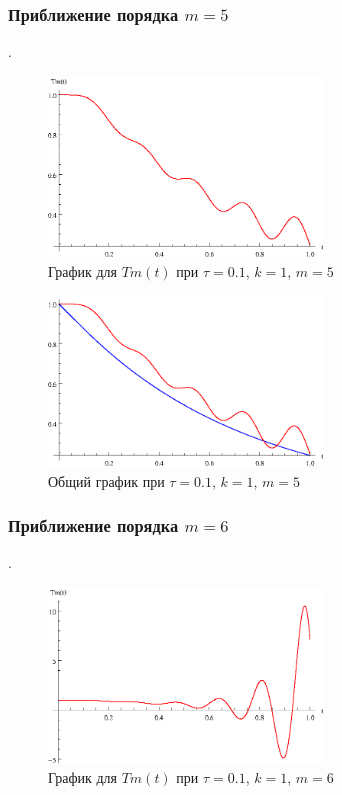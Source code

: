 \newpage

\subsubsection{Приближение порядка $m=5$}.

\begin{figure}[h]
\begin{center}
\includegraphics[width=0.65\textwidth]{./3_results/1_10.eps}
\end{center}
\caption{График для $Tm(t)$ при $\tau=0.1$, $k=1$, $m=5$}
\end{figure}

\begin{figure}[h]
\begin{center}
\includegraphics[width=0.65\textwidth]{./3_results/1_11.eps}
\end{center}
\caption{Общий график при $\tau=0.1$, $k=1$, $m=5$}
\end{figure}

\newpage

\subsubsection{Приближение порядка $m=6$}.

\begin{figure}[h]
\begin{center}
\includegraphics[width=0.65\textwidth]{./3_results/1_12.eps}
\end{center}
\caption{График для $Tm(t)$ при $\tau=0.1$, $k=1$, $m=6$}
\end{figure}

